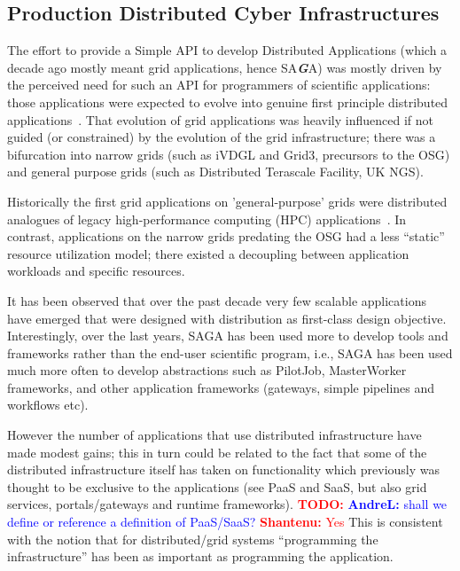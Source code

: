 \documentclass{article}
\newcommand{\B}[1]{\textbf{#1}}
\newcommand{\BI}[1]{\textbf{\textit{#1}}}
\newcommand{\todo}[1]{{\textcolor{red}{\B{TODO:} #1 }}}
\newcommand{\jhanote}[1]{{\textcolor{red}{     \B{Shantenu:} #1 }}}
\newcommand{\alnote}[1]{{\textcolor{blue}{    \B{AndreL:  } #1 }}}
\newcommand{\todo}[1]{}
\newcommand{\jhanote}[1]{}
\newcommand{\alnote}[1]{}
\begin{document}
 \subsection{Production Distributed Cyber Infrastructures}

  The effort to provide a Simple API to develop Distributed Applications
  (which a decade ago mostly meant grid applications, hence SA\BI{G}A)
  was mostly driven by the perceived need for such an API for
  programmers of scientific applications: those applications were
  expected to evolve into genuine first principle distributed
  applications~\cite{gat}.  That evolution of grid applications was
  heavily influenced if not guided (or constrained) by the evolution of
  the grid infrastructure; there was a bifurcation into narrow grids
  (such as iVDGL and Grid3, precursors to the OSG) and general purpose
  grids (such as Distributed Terascale Facility, UK NGS).

  Historically the first grid applications on 'general-purpose' grids
  were distributed analogues of legacy high-performance computing (HPC)
  applications~\cite{dpagrid2009}. In contrast, applications on the
  narrow grids predating the OSG had a less ``static'' resource
  utilization model; there existed a decoupling between application
  workloads and specific resources\cite{boinc}.

  It has been observed that over the past decade very few
  scalable applications have emerged that were designed with 
  distribution as first-class design objective. Interestingly,
  over the last years, SAGA has been used more to develop
  tools and frameworks rather than the end-user scientific program,
  i.e., SAGA has been used much more often to develop abstractions such
  as PilotJob, MasterWorker frameworks, and other application frameworks
  (gateways, simple pipelines and workflows etc).

  However the number of applications that use distributed infrastructure
  have made modest gains; this in turn could be related to the fact that
  some of the distributed infrastructure itself has taken on
  functionality which previously was thought to be exclusive to the
  applications (see PaaS and SaaS, but also grid services,
  portals/gateways and runtime frameworks). \todo{}\alnote{shall we
  define or reference a definition of PaaS/SaaS?}\jhanote{Yes} This is
  consistent with the notion that for distributed/grid systems
  ``programming the infrastructure'' has been as important as
  programming the application.
\end{document}
